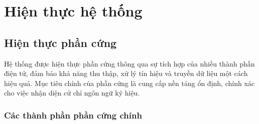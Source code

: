 \section{Hiện thực hệ thống}
\subsection{Hiện thực phần cứng}

Hệ thống được hiện thực phần cứng thông qua sự tích hợp của nhiều thành phần điện tử, đảm bảo khả năng thu thập, xử lý tín hiệu và truyền dữ liệu một cách hiệu quả. Mục tiêu chính của phần cứng là cung cấp nền tảng ổn định, chính xác cho việc nhận diện cử chỉ ngôn ngữ ký hiệu.

\subsubsection{Các thành phần phần cứng chính}

